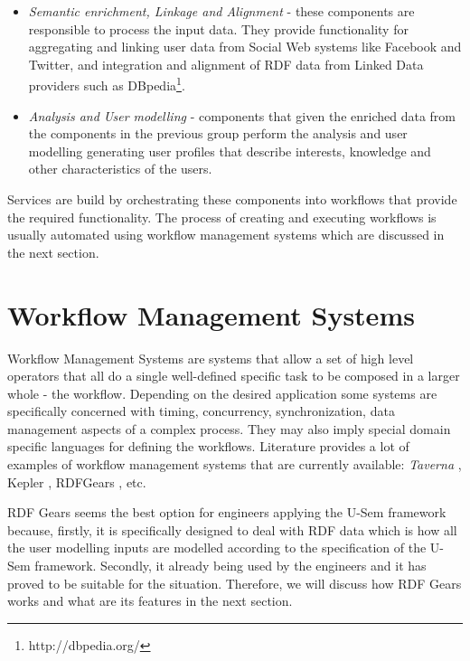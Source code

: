 \begin{itemize}
	\item \textit{Semantic enrichment, Linkage and Alignment} - these components are responsible to process the input data. They provide functionality for aggregating and linking user data from Social Web systems like Facebook and Twitter, and integration and alignment of RDF data from Linked Data providers such as DBpedia\footnote{http://dbpedia.org/}.
	
	\item \textit{Analysis and User modelling} - components that given the enriched data from the components in the previous group perform the analysis and user modelling generating user profiles that describe interests, knowledge and other characteristics of the users.
\end{itemize}

Services are build by orchestrating these components into workflows that provide the required functionality. The process of creating and executing workflows is usually automated using workflow management systems which are discussed in the next section.

\section{Workflow Management Systems}
\label{sec:workfloManagement}

Workflow Management Systems are systems that allow a set of high level operators that all do a single well-defined specific task to be composed in a larger whole - the workflow. Depending on the desired application some systems are specifically concerned with  timing, concurrency, synchronization, data management aspects of a complex process. They may also imply special domain specific languages for defining the workflows. Literature provides a lot of examples of workflow management systems that are currently available: \textit{Taverna} \cite{hull2006taverna}, Kepler \cite{ludascher2006scientific}, RDFGears \cite{feliksik2011}, etc.

RDF Gears seems the best option for engineers applying the U-Sem framework because, firstly, it is specifically designed to deal with RDF data which is how all the user modelling inputs are modelled according to the specification of the U-Sem framework. Secondly, it already being used by the engineers and it has proved to be suitable for the situation. Therefore, we will discuss how RDF Gears works and what are its features in the next section.

